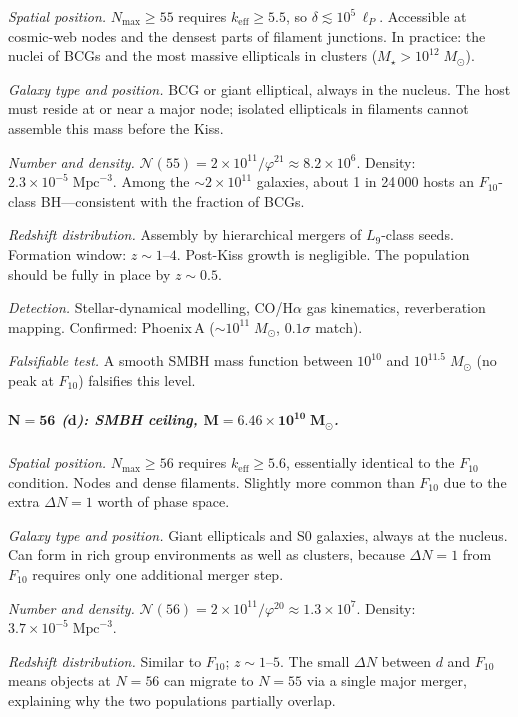 \documentclass[12pt,a4paper]{article}
\begin{document}
\textit{Spatial position.}\; $N_{\max} \geq 55$ requires $k_{\mathrm{eff}} \geq 5.5$, so $\delta \lesssim 10^5\,\ell_P$.  Accessible at cosmic-web nodes and the densest parts of filament junctions.  In practice: the nuclei of BCGs and the most massive ellipticals in clusters ($M_\star > 10^{12}\;M_\odot$).

\textit{Galaxy type and position.}\; BCG or giant elliptical, always in the nucleus.  The host must reside at or near a major node; isolated ellipticals in filaments cannot assemble this mass before the Kiss.

\textit{Number and density.}\; $\mathcal{N}(55) = 2 \times 10^{11}/\varphi^{21} \approx 8.2 \times 10^{6}$.  Density: $2.3 \times 10^{-5}\;\mathrm{Mpc}^{-3}$.  Among the $\sim 2 \times 10^{11}$ galaxies, about 1 in 24\,000 hosts an $F_{10}$-class BH---consistent with the fraction of BCGs.

\textit{Redshift distribution.}\; Assembly by hierarchical mergers of $L_9$-class seeds.  Formation window: $z \sim 1$--$4$.  Post-Kiss growth is negligible.  The population should be fully in place by $z \sim 0.5$.

\textit{Detection.}\; Stellar-dynamical modelling, CO/H$\alpha$ gas kinematics, reverberation mapping.  Confirmed: Phoenix\,A ($\sim 10^{11}\;M_\odot$, $0.1\sigma$ match).

\textit{Falsifiable test.}\; A smooth SMBH mass function between $10^{10}$ and $10^{11.5}\;M_\odot$ (no peak at $F_{10}$) falsifies this level.

\subparagraph{$\boldsymbol{N = 56}$ ($\boldsymbol{d}$): SMBH ceiling, $\boldsymbol{M = 6.46 \times 10^{10}\;M_\odot}$.}

\textit{Spatial position.}\; $N_{\max} \geq 56$ requires $k_{\mathrm{eff}} \geq 5.6$, essentially identical to the $F_{10}$ condition.  Nodes and dense filaments.  Slightly more common than $F_{10}$ due to the extra $\Delta N = 1$ worth of phase space.

\textit{Galaxy type and position.}\; Giant ellipticals and S0 galaxies, always at the nucleus.  Can form in rich group environments as well as clusters, because $\Delta N = 1$ from $F_{10}$ requires only one additional merger step.

\textit{Number and density.}\; $\mathcal{N}(56) = 2 \times 10^{11}/\varphi^{20} \approx 1.3 \times 10^{7}$.  Density: $3.7 \times 10^{-5}\;\mathrm{Mpc}^{-3}$.

\textit{Redshift distribution.}\; Similar to $F_{10}$; $z \sim 1$--$5$.  The small $\Delta N$ between $d$ and $F_{10}$ means objects at $N = 56$ can migrate to $N = 55$ via a single major merger, explaining why the two populations partially overlap.
\end{document}
